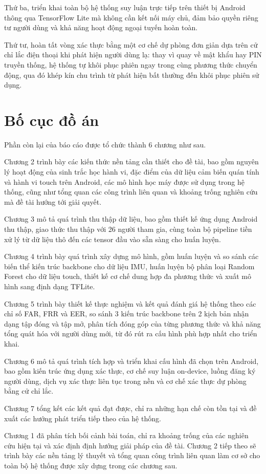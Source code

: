 \documentclass[../DoAn.tex]{subfiles}
\begin{document}
Thứ ba, triển khai toàn bộ hệ thống suy luận trực tiếp trên thiết bị Android thông qua TensorFlow Lite mà không cần kết nối máy chủ, đảm bảo quyền riêng tư người dùng và khả năng hoạt động ngoại tuyến hoàn toàn.

Thứ tư, hoàn tất vòng xác thực bằng một cơ chế dự phòng đơn giản dựa trên cử chỉ lắc điện thoại khi phát hiện người dùng lạ: thay vì quay về mật khẩu hay PIN truyền thống, hệ thống tự khôi phục phiên ngay trong cùng phương thức chuyển động, qua đó khép kín chu trình từ phát hiện bất thường đến khôi phục phiên sử dụng.

\section{Bố cục đồ án}
\label{sec:bocuc}

Phần còn lại của báo cáo được tổ chức thành 6 chương như sau.

Chương 2 trình bày các kiến thức nền tảng cần thiết cho đề tài, bao gồm nguyên lý hoạt động của sinh trắc học hành vi, đặc điểm của dữ liệu cảm biến quán tính và hành vi touch trên Android, các mô hình học máy được sử dụng trong hệ thống, cũng như tổng quan các công trình liên quan và khoảng trống nghiên cứu mà đề tài hướng tới giải quyết.

Chương 3 mô tả quá trình thu thập dữ liệu, bao gồm thiết kế ứng dụng Android thu thập, giao thức thu thập với 26 người tham gia, cùng toàn bộ pipeline tiền xử lý từ dữ liệu thô đến các tensor đầu vào sẵn sàng cho huấn luyện.

Chương 4 trình bày quá trình xây dựng mô hình, gồm huấn luyện và so sánh các biến thể kiến trúc backbone cho dữ liệu IMU, huấn luyện bộ phân loại Random Forest cho dữ liệu touch, thiết kế cơ chế dung hợp đa phương thức và xuất mô hình sang định dạng TFLite.

Chương 5 trình bày thiết kế thực nghiệm và kết quả đánh giá hệ thống theo các chỉ số FAR, FRR và EER, so sánh 3 kiến trúc backbone trên 2 kịch bản nhận dạng tập đóng và tập mở, phân tích đóng góp của từng phương thức và khả năng tổng quát hóa với người dùng mới, từ đó rút ra cấu hình phù hợp nhất cho triển khai.

Chương 6 mô tả quá trình tích hợp và triển khai cấu hình đã chọn trên Android, bao gồm kiến trúc ứng dụng xác thực, cơ chế suy luận on-device, luồng đăng ký người dùng, dịch vụ xác thực liên tục trong nền và cơ chế xác thực dự phòng bằng cử chỉ lắc.

Chương 7 tổng kết các kết quả đạt được, chỉ ra những hạn chế còn tồn tại và đề xuất các hướng phát triển tiếp theo của hệ thống.

Chương 1 đã phân tích bối cảnh bài toán, chỉ ra khoảng trống của các nghiên cứu hiện tại và xác định định hướng giải pháp của đề tài. Chương 2 tiếp theo sẽ trình bày các nền tảng lý thuyết và tổng quan công trình liên quan làm cơ sở cho toàn bộ hệ thống được xây dựng trong các chương sau.
\end{document}
